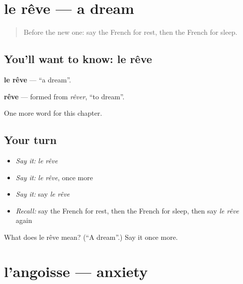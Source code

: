 \section[le rêve]{le rêve — a dream}

\label{lesson:FR-C155-reve}



\begin{quote}
Before the new one: say the French for rest, then the French for sleep.
\end{quote}

\subsection*{You'll want to know: le rêve}
\textbf{le rêve} — \textquotedblleft{}a dream\textquotedblright{}.

\begin{cousinweb}
\textbf{rêve} — formed from \emph{rêver}, \textquotedblleft{}to dream\textquotedblright{}.
\end{cousinweb}

\begin{grammarlens}[title={What you've built}]
One more word for this chapter.
\end{grammarlens}

\subsection*{Your turn}
\begin{itemize}
\raggedright
  \item \emph{Say it:} \emph{le rêve}
  \item \emph{Say it:} \emph{le rêve}, once more
  \item \emph{Say it:} say \emph{le rêve}
  \item \emph{Recall:} say the French for rest, then the French for sleep, then say \emph{le rêve} again
\end{itemize}

\begin{tcolorbox}[breakable,colback=teal!4,colframe=teal!35!black,title={Before you move on}]
What does le rêve mean? (\textquotedblleft{}A dream\textquotedblright{}.) Say it once more.
\end{tcolorbox}
\section[l'angoisse]{l'angoisse — anxiety}

